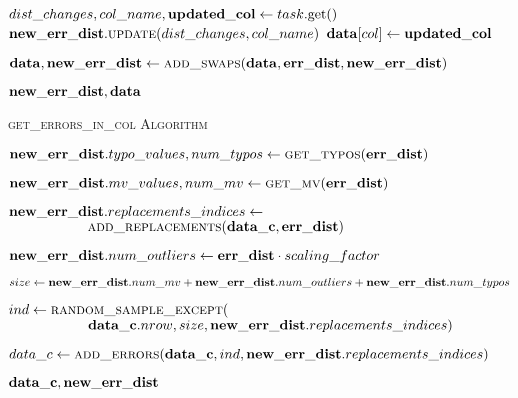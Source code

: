 \begin{algorithm}[!t]
\begin{algorithmic}[1]
	   {
        \STATE $dist\_changes, col\_name, \mathbf{updated\_col} \leftarrow task\text{.get()}$ 
        \STATE $\mathbf{new\_err\_dist}.\textsc{update}(dist\_changes, col\_name)$ 
        \STATE $\mathbf{data}[col] \leftarrow \mathbf{updated\_col}$ 
      }\ENDFOR 
      
      \STATE $\mathbf{data}, \mathbf{new\_err\_dist} \leftarrow \textsc{add\_swaps}(\mathbf{data}, \mathbf{err\_dist}, \mathbf{new\_err\_dist})$ 
      
      \RETURN $\mathbf{new\_err\_dist}, \mathbf{data}$
    \end{algorithmic}
\end{algorithm}


\begin{algorithm}[!t]
    \caption{\textsc{get\_errors\_in\_col Algorithm}}\label{alg:local_get_errors_in_col}
    \begin{algorithmic}[1] 
	  
      \STATE $\mathbf{new\_err\_dist}.typo\_values, num\_typos \leftarrow \textsc{get\_typos}(\mathbf{err\_dist})$ 
	  
      \STATE $\mathbf{new\_err\_dist}.mv\_values, num\_mv \leftarrow \textsc{get\_mv}(\mathbf{err\_dist})$ 
      
      \STATE $\mathbf{new\_err\_dist}.replacements\_indices \leftarrow$
      \STATE $\ \ \ \ \ \ \ \ \ \ \ \ \ \ \ \ \ \textsc{add\_replacements}( \mat{data\_c},  \mat{err\_dist})$ 
      
      \STATE $\mathbf{new\_err\_dist}.num\_outliers \leftarrow \mathbf{err\_dist} \cdot scaling\_factor$ 
      
      \STATE $size \leftarrow \mathbf{new\_err\_dist}.num\_mv + \mathbf{new\_err\_dist}.num\_outliers + \mathbf{new\_err\_dist}.num\_typos$ 
      
      \STATE $ind \leftarrow \textsc{random\_sample\_except}($
      \STATE $\ \ \ \ \ \ \ \ \ \ \ \ \ \ \ \ \ \mat{data\_c}.nrow, size, \mat{new\_err\_dist}.replacements\_indices)$ 
      
	  \STATE $data\_c \leftarrow \textsc{add\_errors}(\mathbf{data\_c}, ind, \mathbf{new\_err\_dist}.replacements\_indices)$ 
      
      \RETURN $\mathbf{data\_c}, \mathbf{new\_err\_dist}$
    \end{algorithmic}
\end{algorithm}
